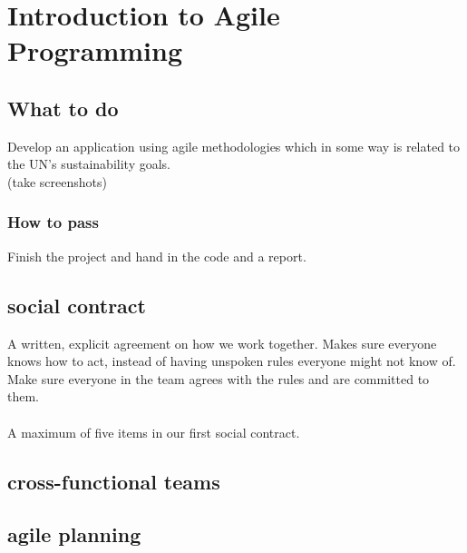 \chapter{Introduction to Agile Programming}
\section{What to do}

Develop an application using agile methodologies which in some way is related to the UN's sustainability goals.\\
(take screenshots)

\subsection{How to pass}
Finish the project and hand in the code and a report.

\section{social contract}
A written, explicit agreement on how we work together. Makes sure everyone knows how to act, instead of having unspoken rules everyone might not know of. Make sure everyone in the team agrees with the rules and are committed to them.\\
\\
A maximum of five items in our first social contract.

\section{cross-functional teams}
\section{agile planning}